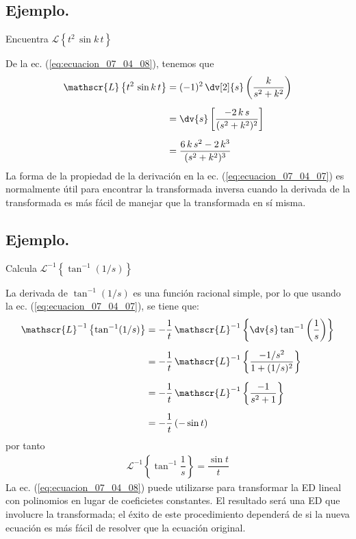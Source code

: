 \subsection*{Ejemplo.}
Encuentra $\mathscr{L} \left\{ t^{2} \, \sin k \, t \right\}$
\par
De la ec. (\ref{eq:ecuacion_07_04_08}), tenemos que
\begin{align}
\begin{aligned}
\mathscr{L} \left\{ t^{2} \, \sin k \, t \right\} &= (-1)^{2} \, \dv[2]{s} \left( \dfrac{k}{s^{2} + k^{2}} \right) \\[0.5em]
&= \dv{s} \left[ \dfrac{-2 \, k \, s}{(s^{2} + k^{2})^{2}} \right] \\[0.5em]
&= \dfrac{6 \, k \, s^{2} - 2 \, k^{3}}{(s^{2} + k^{2})^{3}}  
\end{aligned}
\label{eq:ecuacion_07_04_09}
\end{align}
La forma de la propiedad de la derivación en la ec. (\ref{eq:ecuacion_07_04_07}) es normalmente útil para encontrar la transformada inversa cuando la derivada de la transformada es más fácil de manejar que la transformada en sí misma.
\subsection*{Ejemplo.}
Calcula $\mathscr{L}^{-1} \left\{ \tan^{-1} (1/s) \right\}$
\par
La derivada de $\tan^{-1}(1/s)$ es una función racional simple, por lo que usando la ec. (\ref{eq:ecuacion_07_04_07}), se tiene que:
\begin{align*}
\mathscr{L}^{-1} \left\{ \tan^{-1} (1/s) \right\} &= -\dfrac{1}{t} \, \mathscr{L}^{-1} \left\{ \dv{s} \tan^{-1} \left( \dfrac{1}{s} \right) \right\} \\[0.5em]
&= -\dfrac{1}{t} \, \mathscr{L}^{-1} \left\{ \dfrac{-1/s^{2}}{1 + (1/s)^{2}} \right\} \\[0.5em]
&= -\dfrac{1}{t} \, \mathscr{L}^{-1} \left\{ \dfrac{-1}{s^{2} + 1} \right\} \\[0.5em]
&= -\dfrac{1}{t} \,(- \sin t)
\end{align*}
por tanto
\begin{align*}
\mathscr{L}^{-1} \left\{ \tan^{-1} \dfrac{1}{s} \right\} = \dfrac{\sin t}{t}
\end{align*}
La ec. (\ref{eq:ecuacion_07_04_08}) puede utilizarse para transformar la ED lineal con polinomios en lugar de coeficietes constantes. El resultado será una ED que involucre la transformada; el éxito de este procedimiento dependerá de si la nueva ecuación es más fácil de resolver que la ecuación original.
